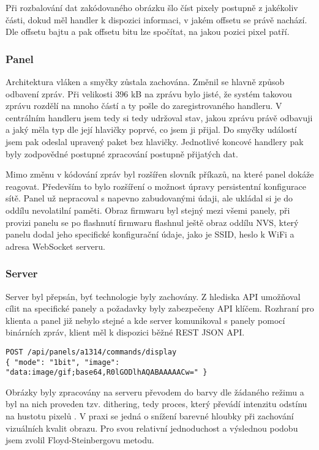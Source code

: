 Při rozbalování dat zakódovaného obrázku šlo číst pixely postupně z jakékoliv části, dokud měl handler k dispozici informaci, v jakém offsetu se právě nachází. Dle offsetu bajtu a pak offsetu bitu lze spočítat, na jakou pozici pixel patří.

\subsubsection{Panel}
Architektura vláken a smyčky zůstala zachována. Změnil se hlavně způsob odbavení zpráv. Při velikosti 396 kB na zprávu bylo jisté, že systém takovou zprávu rozdělí na mnoho částí a ty pošle do zaregistrovaného handleru. V centrálním handleru jsem tedy si tedy udržoval stav, jakou zprávu právě odbavuji a jaký měla typ dle její hlavičky poprvé, co jsem ji přijal. Do smyčky událostí jsem pak odeslal upravený paket bez hlavičky. Jednotlivé koncové handlery pak byly zodpovědné postupné zpracování postupně přijatých dat.

Mimo změnu v kódování zpráv byl rozšířen slovník příkazů, na které panel dokáže reagovat. Především to bylo rozšíření o možnost úpravy persistentní konfigurace sítě. Panel už nepracoval s napevno zabudovanými údaji, ale ukládal si je do oddílu nevolatilní paměti. Obraz firmwaru byl stejný mezi všemi panely, při provizi panelu se po flashnutí firmwaru flashnul ještě obraz oddílu NVS, který panelu dodal jeho specifické konfigurační údaje, jako je SSID, heslo k WiFi a adresa WebSocket serveru.

\subsubsection{Server}
Server byl přepsán, byť technologie byly zachovány. Z hlediska API umožňoval cílit na specifické panely a požadavky byly zabezpečeny API klíčem. Rozhraní pro klienta a panel již nebylo stejné a kde server komunikoval s panely pomocí binárních zpráv, klient měl k dispozici běžné REST JSON API.

\begin{lstlisting}[label=src:gateway-rest-api,caption={Ukázka požadavku na server pro částečné překreslení obrázku}]
POST /api/panels/a1314/commands/display
{ "mode": "1bit", "image": "data:image/gif;base64,R0lGODlhAQABAAAAACw=" }
\end{lstlisting}

Obrázky byly zpracovány na serveru převodem do barvy dle žádaného režimu a byl na nich proveden tzv. dithering, tedy proces, který převádí intenzitu odstínu na hustotu pixelů \cite{Dithering}. V praxi se jedná o snížení barevné hloubky při zachování vizuálních kvalit obrazu. Pro svou relativní jednoduchost a výslednou podobu jsem zvolil Floyd-Steinbergovu metodu.

